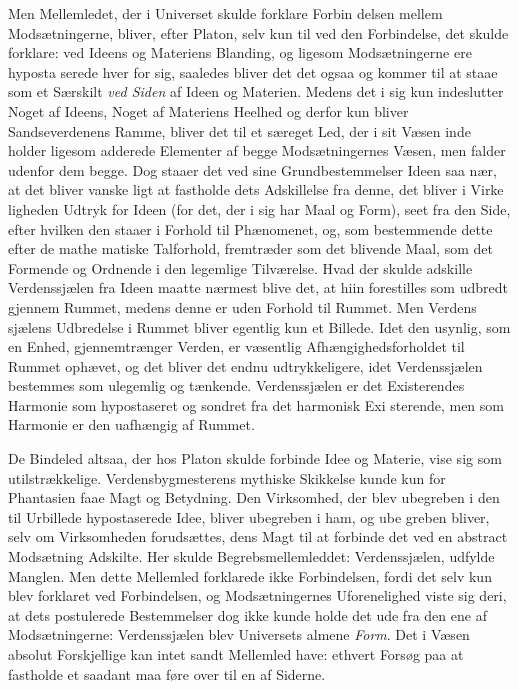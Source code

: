 \documentclass[12pt,a4paper]{book}
\begin{document}
Men Mellemledet, der i Universet skulde forklare Forbin\-%
delsen mellem Modsætningerne, bliver, efter Platon, selv kun
til ved den Forbindelse, det skulde forklare: ved Ideens og
Materiens Blanding, og ligesom Modsætningerne ere hyposta\-%
serede hver for sig, saaledes bliver det det ogsaa og kommer
til at staae som et Særskilt \emph{ved Siden} af Ideen og Materien.
Medens det i sig kun indeslutter Noget af Ideens, Noget af
Materiens Heelhed og derfor kun bliver Sandseverdenens
Ramme, bliver det til et særeget Led, der i sit Væsen inde\-%
holder ligesom adderede Elementer af begge Modsætningernes
Væsen, men falder udenfor dem begge. Dog staaer det ved
sine Grundbestemmelser Ideen saa nær, at det bliver vanske\-%
ligt at fastholde dets Adskillelse fra denne, det bliver i Virke\-%
ligheden Udtryk for Ideen (for det, der i sig har Maal og
Form), seet fra den Side, efter hvilken den staaer i Forhold
til Phænomenet, og, som bestemmende dette efter de mathe\-%
matiske Talforhold, fremtræder som det blivende Maal, som
det Formende og Ordnende i den legemlige Tilværelse. Hvad
der skulde adskille Verdenssjælen fra Ideen maatte nærmest
blive det, at hiin forestilles som udbredt gjennem Rummet,
medens denne er uden Forhold til Rummet. Men Verdens\-%
sjælens Udbredelse i Rummet bliver egentlig kun et Billede.
Idet den usynlig, som en Enhed, gjennemtrænger Verden, er
væsentlig Afhængighedsforholdet til Rummet ophævet, og det
bliver det endnu udtrykkeligere, idet Verdenssjælen bestemmes
som ulegemlig og tænkende. Verdenssjælen er det Existerendes
Harmonie som hypostaseret og sondret fra det harmonisk Exi\-%
sterende, men som Harmonie er den uafhængig af Rummet.

De Bindeled altsaa, der hos Platon skulde forbinde Idee
og Materie, vise sig som utilstrækkelige. Verdensbygmesterens
mythiske Skikkelse kunde kun for Phantasien faae Magt og
Betydning. Den Virksomhed, der blev ubegreben i den til
Urbillede hypostaserede Idee, bliver ubegreben i ham, og ube\-%
greben bliver, selv om Virksomheden forudsættes, dens Magt
til at forbinde det ved en abstract Modsætning Adskilte. Her
skulde Begrebsmellemleddet: Verdenssjælen, udfylde Manglen.
Men dette Mellemled forklarede ikke Forbindelsen, fordi det
selv kun blev forklaret ved Forbindelsen, og Modsætningernes
Uforenelighed viste sig deri, at dets postulerede Bestemmelser
dog ikke kunde holde det ude fra den ene af Modsætningerne:
Verdenssjælen blev Universets almene \emph{Form}. Det i Væsen
absolut Forskjellige kan intet sandt Mellemled have: ethvert
Forsøg paa at fastholde et saadant maa føre over til en af
Siderne.
\end{document}
